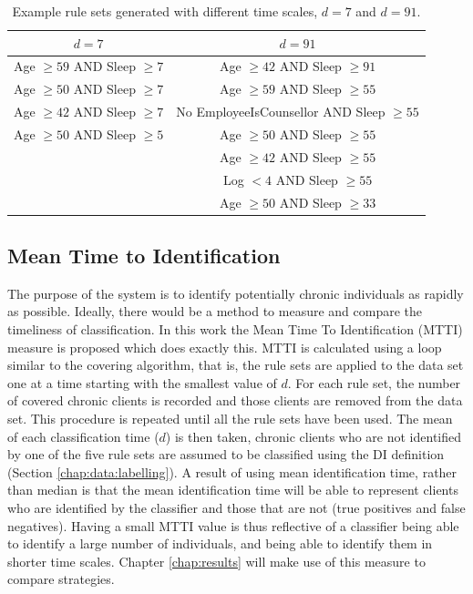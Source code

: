 \begin{table}[h]
	\centering

	\begin{tabular}{cc}
	\toprule
	$d=7$ & $d=91$ \\
	\midrule
	Age $\geq 59$ AND Sleep $\geq 7$ & Age $\geq 42$ AND Sleep $\geq 91$ \\
	Age $\geq 50$ AND Sleep $\geq 7$ & Age $\geq 59$ AND Sleep $\geq 55$ \\
	Age $\geq 42$ AND Sleep $\geq 7$ & No EmployeeIsCounsellor AND Sleep $\geq 55$ \\
	Age $\geq 50$ AND Sleep $\geq 5$ & Age $\geq 50$ AND Sleep $\geq 55$ \\
																	 & Age $\geq 42$ AND Sleep $\geq 55$ \\
																	 & Log $< 4$ AND Sleep $\geq 55$ \\
																	 & Age $\geq 50$ AND Sleep $\geq 33$ \\

	\bottomrule
	\end{tabular}

	\caption{Example rule sets generated with different time scales, $d=7$ and $d=91$.}
	\label{tbl:algo:exampledays}
\end{table}

\subsection{Mean Time to Identification} \label{chap:algo:mtti}

The purpose of the \Abb system is to identify potentially chronic individuals as rapidly as possible. Ideally, there would be a method to measure and compare the timeliness of classification. In this work the Mean Time To Identification (MTTI) measure is proposed which does exactly this. MTTI is calculated using a loop similar to the covering algorithm, that is, the rule sets are applied to the data set one at a time starting with the smallest value of $d$. For each rule set, the number of covered chronic clients is recorded and those clients are removed from the data set. This procedure is repeated until all the rule sets have been used.
The mean of each classification time ($d$) is then taken, chronic clients who are not identified by one of the five rule sets are assumed to be classified using the DI definition (Section \ref{chap:data:labelling}). A result of using mean identification time, rather than median is that the mean identification time will be able to represent clients who are identified by the classifier and those that are not (true positives and false negatives). Having a small MTTI value is thus reflective of a classifier being able to identify a large number of individuals, and being able to identify them in shorter time scales. Chapter \ref{chap:results} will make use of this measure to compare \Abb strategies.

